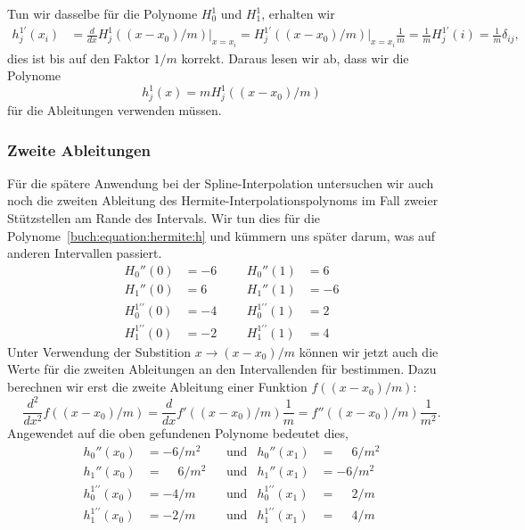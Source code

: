 Tun wir dasselbe für die Polynome $H_0^1$ und $H_1^1$, erhalten wir
\begin{align*}
h_j^{1\prime}(x_i)
&=
\frac{d}{dx} H_j^1((x-x_0)/m) \bigg|_{x=x_i}
=
H_j^{1\prime}((x-x_0)/m)\bigg|_{x=x_i} \frac{1}{m}
=
\frac1m
H_j^{1\prime}(i)
=
\frac1m\delta_{ij},
\end{align*}
dies ist bis auf den Faktor $1/m$ korrekt.
Daraus lesen wir ab, dass wir die Polynome
\[
h_j^1(x)
=
mH_j^1((x-x_0)/m)
\]
für die Ableitungen verwenden müssen.

\subsubsection{Zweite Ableitungen}
Für die spätere Anwendung bei der Spline-Interpolation untersuchen
wir auch noch die zweiten Ableitung des Hermite-Interpolationspolynoms
im Fall zweier Stützstellen am Rande des Intervals.
Wir tun dies für die Polynome~\eqref{buch:equation:hermite:h}
und kümmern uns später darum, was auf anderen Intervallen passiert.
\[
\begin{aligned}
H_0''(0)                &= -6 &&&  H_0''(1)                &=  6
\\
H_1''(0)                &=  6 &&&  H_1''(1)                &= -6
\\
H_0^{1\prime\prime}(0)  &= -4 &&&  H_0^{1\prime\prime}(1)  &=  2
\\
H_1^{1\prime\prime}(0)  &= -2 &&&  H_1^{1\prime\prime}(1)  &=  4
\end{aligned}
\]
Unter Verwendung der Substition $x\to (x-x_0)/m$ können wir jetzt auch
die Werte für die zweiten Ableitungen an den Intervallenden für bestimmen.
Dazu berechnen wir erst die zweite Ableitung einer Funktion $f((x-x_0)/m)$:
\[
\frac{d^2}{dx^2} f((x-x_0)/m)
=
\frac{d}{dx} f'((x-x_0)/m) \frac1m
=
f''((x-x_0)/m) \frac1{m^2}.
\]
Angewendet auf die oben gefundenen Polynome bedeutet dies, 
\[
\begin{aligned}
h_0''(x_0) &=          - 6/m^2
&&\text{und}&
h_0''(x_1) &= \phantom{-}6/m^2 \\
h_1''(x_0) &= \phantom{-}6/m^2
&&\text{und}&
h_1''(x_1) &=          - 6/m^2 \\
h_0^{1\prime\prime}(x_0) &=           -4/m
&&\text{und}&
h_0^{1\prime\prime}(x_1) &= \phantom{-}2/m \\
h_1^{1\prime\prime}(x_0) &=          - 2/m
&&\text{und}&
h_1^{1\prime\prime}(x_1) &= \phantom{-}4/m 
\end{aligned}
\]






